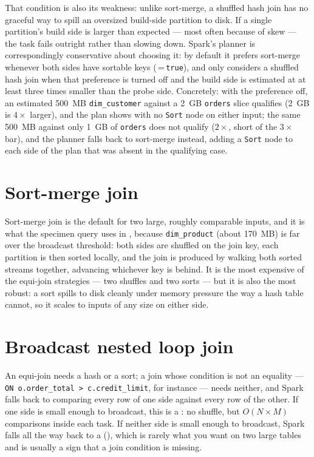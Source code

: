 That condition is also its weakness: unlike sort-merge, a shuffled hash join
has no graceful way to spill an oversized build-side partition to disk. If a
single partition's build side is larger than expected --- most often because of
skew --- the task fails outright rather than slowing down. Spark's planner is
correspondingly conservative about choosing it: by default it prefers
sort-merge whenever both sides have sortable keys
(\,=\,\texttt{true}), and only
considers a shuffled hash join when that preference is turned off and the
build side is estimated at at least three times smaller than the probe side.
Concretely: with the preference off, an estimated 500~MB \texttt{dim\_customer}
against a 2~GB \texttt{orders} slice qualifies (2~GB is $4\times$ larger), and
the plan shows  with no \texttt{Sort} node on either
input; the same 500~MB against only 1~GB of \texttt{orders} does not qualify
($2\times$, short of the $3\times$ bar), and the planner falls back to
sort-merge instead, adding a \texttt{Sort} node to each side of the plan that
was absent in the qualifying case.

\section{Sort-merge join}
\label{sec:joins-smj}

Sort-merge join is the default for two large, roughly comparable inputs, and it
is what the specimen query uses in , because
\texttt{dim\_product} (about 170~MB) is far over the broadcast threshold: both
sides are shuffled on the join key, each partition is then sorted locally, and the join is
produced by walking both sorted streams together, advancing whichever key is
behind. It is the most expensive of the equi-join strategies --- two shuffles
and two sorts --- but it is also the most robust: a sort spills to disk cleanly
under memory pressure the way a hash table cannot, so it scales to inputs of any
size on either side.

\section{Broadcast nested loop join}
\label{sec:joins-bnlj}

An equi-join needs a hash or a sort; a join whose condition is not an equality
--- \texttt{ON o.order\_total > c.credit\_limit}, for instance --- needs neither, and
Spark falls back to comparing every row of one side against every row of the
other. If one side is small enough to broadcast, this is a
: no shuffle, but $O(N \times M)$ comparisons
inside each task. If neither side is small enough to broadcast, Spark falls all
the way back to a  (), which is
rarely what you want on two large tables and is usually a sign that a join
condition is missing.

